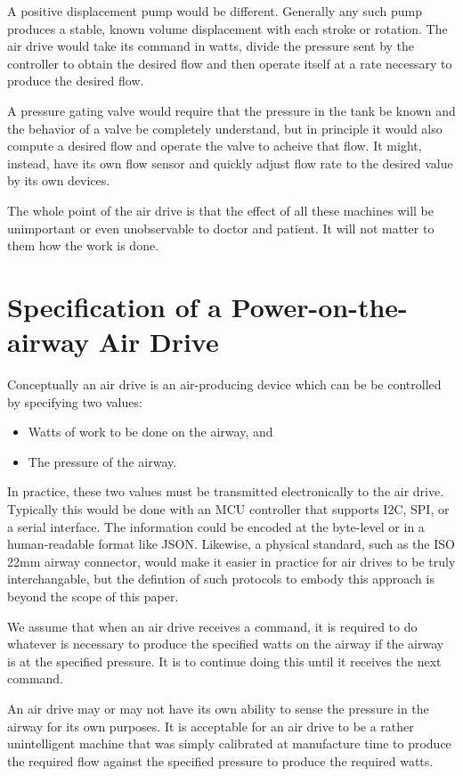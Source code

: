 \documentclass{article}
\begin{document}
A positive displacement pump would be different. Generally any such pump produces a stable, known volume displacement with each
stroke or rotation. The air drive would take its command in watts, divide the pressure sent by the controller to obtain
the desired flow and then operate itself at a rate necessary to produce the desired flow.

A pressure gating valve would require that the pressure in the tank be known and the behavior of a valve
be completely understand, but in principle it would also compute a desired flow and operate the valve to acheive that
flow. It might, instead, have its own flow sensor and quickly adjust flow rate to the desired value by its own devices.

The whole point of the air drive is that the effect of all these machines will be unimportant or even unobservable
to doctor and patient. It will not matter to them how the work is done.

\section{Specification of a Power-on-the-airway Air Drive}

Conceptually an air drive is an air-producing device which can be be controlled by specifying two values:
\begin{itemize}
 \item Watts of work to be done on the airway, and
 \item The pressure of the airway.
\end{itemize}

In practice, these two values must be transmitted electronically to the air drive.
Typically this would be done with an MCU controller that supports I2C, SPI, or a serial interface.
The information could be encoded at the byte-level or in a human-readable format like JSON.
Likewise, a physical standard, such as the ISO 22mm airway connector, would make it easier
in practice for air drives to be truly interchangable, but
the defintion of such protocols to embody this approach is beyond the scope of this paper.

We assume that when an air drive receives a command, it is required to
do whatever is necessary to produce the specified
watts on the airway if the airway is at the specified pressure.
It is to continue doing this until it receives the next command.

An air drive may or may not have its own ability to sense the pressure in the airway
for its own purposes. It is acceptable for an air drive to be a rather unintelligent
machine that was simply calibrated at manufacture time to produce the required
flow against the specified pressure to produce the required watts.
\end{document}
